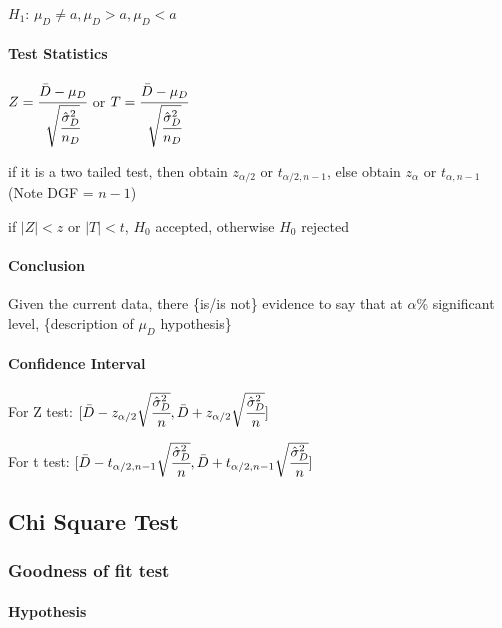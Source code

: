 \documentclass[]{article}
\let\oldparagraph\paragraph
\renewcommand{\paragraph}[1]{\oldparagraph{#1}\mbox{}}
\begin{document}
\(H_1\): \(\mu_D \ne a, \mu_D > a, \mu_D < a\)

\paragraph{Test Statistics}\label{header-n183}

\(Z = \cfrac{\bar{D} - \mu_D}{\sqrt{\cfrac{\hat{\sigma}^2_D}{n_D}}}\) or
\(T = \cfrac{\bar{D} - \mu_D}{\sqrt{\cfrac{\hat{\sigma}^2_D}{n_D}}}\)

if it is a two tailed test, then obtain \(z_{\alpha/2}\) or
\(t_{\alpha/2 , n-1}\), else obtain \(z_{\alpha}\) or
\(t_{\alpha, n-1}\)(Note DGF = \(n - 1\))

if \(|Z| < z\) or \(|T| < t\), \(H_0\) accepted, otherwise \(H_0\)
rejected

\paragraph{Conclusion}\label{header-n187}

Given the current data, there \{is/is not\} evidence to say that at
\(\alpha\)\% significant level, \{description of \(\mu_D\) hypothesis\}

\paragraph{Confidence Interval}\label{header-n189}

For Z test:
\([\bar{D} - z_{\alpha/2}\sqrt{\cfrac{\hat{\sigma}^2_D}{n}},\bar{D} + z_{\alpha/2}\sqrt{\cfrac{\hat{\sigma}^2_D}{n}}]\)

For t test:
\([\bar{D} - t_{\alpha/2,n-1}\sqrt{\cfrac{\hat{\sigma}^2_D}{n}},\bar{D} + t_{\alpha/2,n-1}\sqrt{\cfrac{\hat{\sigma}^2_D}{n}}]\)

\subsection{Chi Square Test}\label{header-n192}

\subsubsection{Goodness of fit test}\label{header-n193}

\paragraph{Hypothesis}\label{header-n194}
\end{document}
